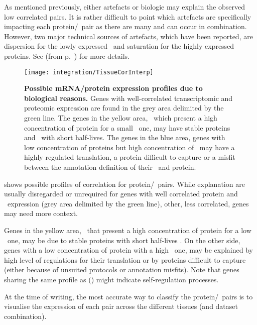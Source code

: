 As mentioned previously,
either artefacts or biologie may explain the observed low correlated pairs.
It is rather difficult to point
which artefacts are specifically impacting each protein/\mRNA\ pair
as there are many and can occur in combination.
However, two major technical sources of artefacts,
which have been reported,
are dispersion for the lowly expressed \mRNAs\ and
saturation for the highly expressed proteins.
See  (from p.~\pageref{sec:transExplo})
for more details.
\vspace{-2mm}

\begin{figure}[!htb]
    \texttt{[image: integration/TissueCorInterp]}\centering
    \vspace{-3mm}
    \caption[Possible mRNA/protein expression profiles
    due to biological reasons.]{\label{fig:CorImprovable}%
    \textbf{Possible mRNA/protein expression profiles due to biological reasons.}
    Genes with well-correlated transcriptomic and proteomic expression
    are found in the grey area delimited by the green line.
    The genes in the yellow area,
    \ie\ which present a high concentration of protein for a small \mRNA\ one,
    may have stable proteins and \mRNAs\ with short half-lives.
    The genes in the blue area,
    genes with low concentration of proteins but high concentration of \mRNAs\
    may have a highly regulated translation,
    a protein difficult to capture
    or a misfit between the annotation definition of their \mRNA\ and protein.
    }
\end{figure}


 shows possible profiles of correlation for
protein/\mRNA\ pairs.
While explanation are usually disregarded or unrequired for genes
with well correlated protein and \mRNA\ expression
(grey area delimited by the green line),
other, less correlated, genes may need more context.

Genes in the yellow area,
\ie\ that present a high concentration of protein for a low \mRNA\ one,
may be due to stable proteins with short half-lives \mRNAs{}.
On the other side,
genes with a low concentration of protein with a high \mRNA\ one,
may be explained by high level of regulations for their translation
or by proteins difficult to capture
(either because of unsuited protocols or annotation misfits).
Note that genes sharing the same profile as  ()
might indicate self-regulation processes.

At the time of writing,
the most accurate way to classify the protein/\mRNA\ pairs
is to visualise the expression of each pair across the different tissues
(and dataset combination).

